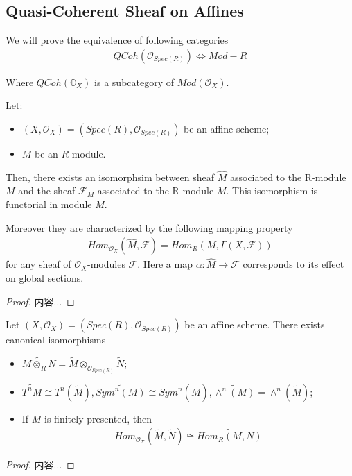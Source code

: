 \documentclass[Total.tex]{subfiles}
\begin{document}
		\subsection{Quasi-Coherent Sheaf on Affines}
			We will prove the equivalence of following categories
			\begin{gather*}
				QCoh(\mathcal{O}_{Spec(R)})\Leftrightarrow Mod-R
			\end{gather*}
			
			Where $QCoh(\mathbb{O}_X)$ is a subcategory of $Mod(\mathcal{O}_X)$.
			
			\begin{lemma}
				Let: 
				\begin{itemize}
					\item $(X,\mathcal{O}_X)=(Spec(R),\mathcal{O}_{Spec(R)})$ be an affine scheme; 
					\item $M$ be an $R$-module. 
				\end{itemize}
				
				Then, there exists an isomorphsim between sheaf $\hat{M}$ associated to the R-module $M$ and the sheaf $\mathcal{F}_M$ associated to the R-module $M$. This isomorphism is functorial in module $M$. 
				
				Moreover they are characterized by the following mapping property
				\begin{gather*}
					Hom_{\mathcal{O}_X}(\hat{M},\mathcal{F})=Hom_R(M,\Gamma(X,\mathcal{F}))
				\end{gather*}
				for any sheaf of $\mathcal{O}_X$-modules $\mathcal{F}$. Here a map $\alpha:\hat{M}\rightarrow \mathcal{F}$ corresponds to its effect on global sections.
			\end{lemma}
			\begin{proof}
				内容...
			\end{proof}
			
			\begin{lemma}
				Let $(X,\mathcal{O}_X)=(Spec(R),\mathcal{O}_{Spec(R)})$ be an affine scheme. There exists canonical isomorphisms
				\begin{itemize}
					\item $\widetilde{M\otimes_R N}=\widetilde{M}\otimes_{\mathcal{O}_{Spec(R)}}\widetilde{N}$;
					\item $\widetilde{T^nM}\cong T^n(\widetilde{M}),\widetilde{Sym^n(M)}\cong Sym^n(\widetilde{M}),\widetilde{\wedge^n(M)}=\wedge^n (\widetilde{M})$;
					\item If $M$ is finitely presented, then
					\begin{gather*}
						Hom_{\mathcal{O}_X}(\tilde{M},\tilde{N})\cong \widetilde{Hom_R(M,N)}
					\end{gather*}
				\end{itemize}
			\end{lemma}
			\begin{proof}
				内容...
			\end{proof}
			
\end{document}
